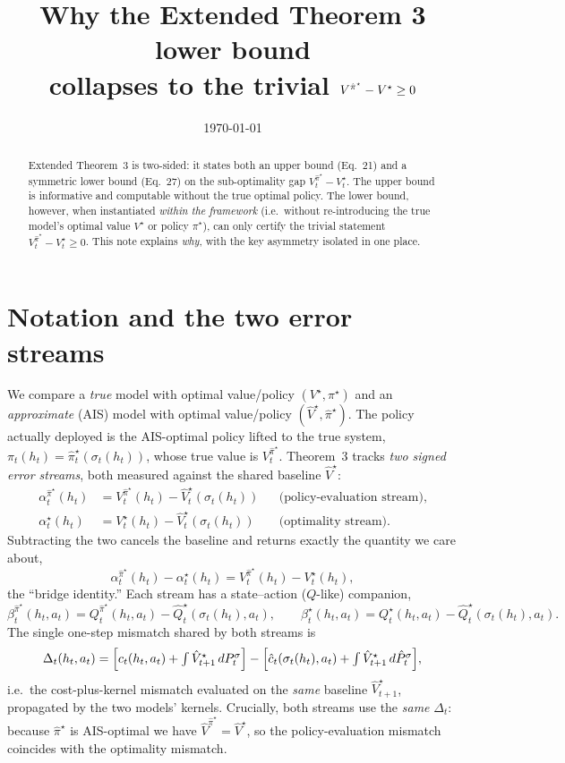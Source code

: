 \documentclass[11pt]{article}
\title{Why the Extended Theorem 3 lower bound\\ collapses to the trivial $V^{\pihat^\star}-V^\star\ge 0$}
\date{\today}
\newcommand{\Vhat}{\hat V}
\newcommand{\Qhat}{\hat Q}
\newcommand{\pihat}{\hat\pi}
\theoremstyle{definition}
\begin{document}
\maketitle

\begin{abstract}
Extended Theorem~3 is two-sided: it states both an upper bound (Eq.~21) and a
symmetric lower bound (Eq.~27) on the sub-optimality gap
$V^{\pihat^\star}_t-V^\star_t$. The upper bound is informative and computable
without the true optimal policy. The lower bound, however, when instantiated
\emph{within the framework} (i.e.\ without re-introducing the true model's optimal
value $V^\star$ or policy $\pi^\star$), can only certify the trivial statement
$V^{\pihat^\star}_t-V^\star_t\ge 0$. This note explains \emph{why}, with the key
asymmetry isolated in one place.
\end{abstract}

\section{Notation and the two error streams}
We compare a \emph{true} model with optimal value/policy $(V^\star,\pi^\star)$ and
an \emph{approximate} (AIS) model with optimal value/policy
$(\Vhat^\star,\pihat^\star)$. The policy actually deployed is the AIS-optimal
policy lifted to the true system, $\pi_t(h_t)=\pihat^\star_t(\sigma_t(h_t))$, whose
true value is $V^{\pihat^\star}_t$. Theorem~3 tracks \emph{two signed error
streams}, both measured against the shared baseline $\Vhat^\star$:
\begin{align}
\alpha^{\pihat^\star}_t(h_t) &= V^{\pihat^\star}_t(h_t)-\Vhat^\star_t(\sigma_t(h_t))
&&\text{(policy-evaluation stream),}\\
\alpha^{\star}_t(h_t) &= V^{\star}_t(h_t)-\Vhat^\star_t(\sigma_t(h_t))
&&\text{(optimality stream).}
\end{align}
Subtracting the two cancels the baseline and returns exactly the quantity we care
about,
\begin{equation}
\alpha^{\pihat^\star}_t(h_t)-\alpha^{\star}_t(h_t)
= V^{\pihat^\star}_t(h_t)-V^{\star}_t(h_t),
\label{eq:bridge}
\end{equation}
the ``bridge identity.'' Each stream has a state--action ($Q$-like) companion,
\begin{equation}
\beta^{\pihat^\star}_t(h_t,a_t)=Q^{\pihat^\star}_t(h_t,a_t)-\Qhat^\star_t(\sigma_t(h_t),a_t),
\qquad
\beta^{\star}_t(h_t,a_t)=Q^{\star}_t(h_t,a_t)-\Qhat^\star_t(\sigma_t(h_t),a_t).
\end{equation}
The single one-step mismatch shared by both streams is
\begin{equation}
\Delta_t(h_t,a_t)=
\Bigl[c_t(h_t,a_t)+\textstyle\int \Vhat^\star_{t+1}\,dP^\sigma_t\Bigr]
-\Bigl[\hat c_t(\sigma_t(h_t),a_t)+\textstyle\int \Vhat^\star_{t+1}\,d\hat P^\sigma_t\Bigr],
\label{eq:delta}
\end{equation}
i.e.\ the cost-plus-kernel mismatch evaluated on the \emph{same} baseline
$\Vhat^\star_{t+1}$, propagated by the two models' kernels. Crucially, both streams
use the \emph{same} $\Delta_t$: because $\pihat^\star$ is AIS-optimal we have
$\Vhat^{\pihat^\star}=\Vhat^\star$, so the policy-evaluation mismatch coincides
with the optimality mismatch.
\end{document}
